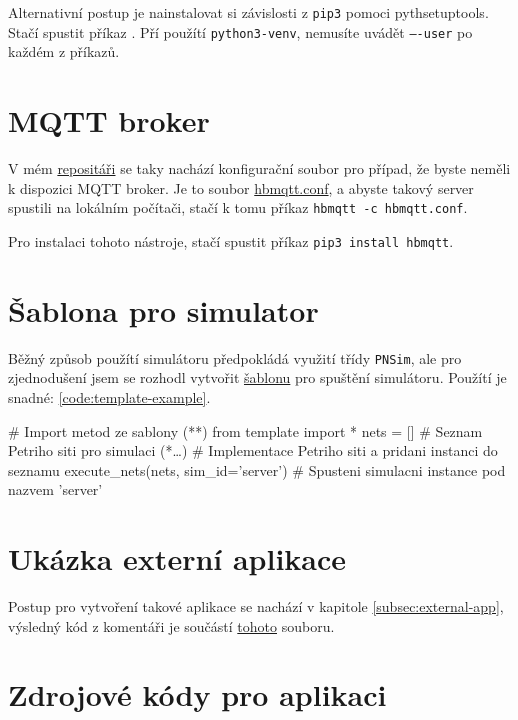 Alternativní postup je nainstalovat si závislosti z \texttt{pip3} pomoci pyth{setuptools}. Stačí spustit příkaz . Pří použítí \texttt{python3-venv}, nemusíte uvádět \texttt{----user} po každém z příkazů.
\section{MQTT broker}

V mém \href{https://github.com/Danil-Grigorev/rt-sim-petry-net}{repositáři} se taky nachází konfigurační soubor pro případ, že byste neměli k dispozici MQTT broker. Je to soubor \href{https://github.com/Danil-Grigorev/rt-sim-petry-net/blob/master/hbmqtt.conf}{hbmqtt.conf}, a abyste takový server spustili na lokálním počítači, stačí k tomu příkaz \texttt{hbmqtt -c hbmqtt.conf}.

Pro instalaci tohoto nástroje, stačí spustit příkaz \texttt{pip3 install hbmqtt}.

\section{Šablona pro simulator}

Běžný způsob použítí simulátoru předpokládá využití třídy \texttt{PNSim}, ale pro zjednodušení jsem se rozhodl vytvořit \href{https://github.com/Danil-Grigorev/rt-sim-petry-net/blob/master/template.py}{šablonu} pro spuštění simulátoru. Použítí je snadné: \ref{code:template-example}.

\begin{python}
    # Import metod ze sablony (*\label{code:template-example}*)
    from template import *
    nets = [] # Seznam Petriho siti pro simulaci
    (*\ldots*) # Implementace Petriho siti a pridani instanci do seznamu
    execute_nets(nets, sim_id='server') # Spusteni simulacni instance pod nazvem 'server'
\end{python}

\section{Ukázka externí aplikace}
\label{sec:external-app-example}

Postup pro vytvoření takové aplikace se nachází v kapitole \ref{subsec:external-app}, výsledný kód z komentáři je součástí \href{https://github.com/Danil-Grigorev/rt-sim-petry-net/blob/master/temperature_logger.py}{tohoto} souboru.

\section{Zdrojové kódy pro aplikaci}

